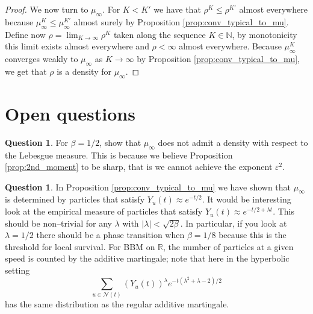 \documentclass{article}
\theoremstyle{definition}
\newtheorem{quest}[thm]{Question}
\numberwithin{equation}{section}
\numberwithin{thm}{section}
\newcommand*{\eps}{\ensuremath{\varepsilon}}            %
\newcommand*{\RR}{\ensuremath{\mathbb{R}}}	        	%
\newcommand*{\NN}{\ensuremath{\mathbb{N}}}		        %
\begin{document}
\begin{proof}
    We now turn to $\mu_\infty$. For $K<K'$ we have that $\rho^K \leq \rho^{K'}$ almost everywhere because $\mu^K_\infty \leq \mu^{K'}_\infty$ almost surely by Proposition \ref{prop:conv_typical_to_mu}. Define now $\rho = \lim_{K \to \infty} \rho^K$ taken along the sequence $K\in \NN$, by monotonicity this limit exists almost everywhere and $\rho<\infty$ almost everywhere. Because $\mu^K_\infty$ converges weakly to $\mu_\infty$ as $K\to \infty$ by Proposition \ref{prop:conv_typical_to_mu}, we get that $\rho$ is a density for $\mu_\infty$. 
\end{proof}

\section{Open questions}\label{sec:open_questions}

\begin{quest}
    For $\beta=1/2$, show that $\mu_\infty$ does not admit a density with respect to the Lebesgue measure. This is because we believe Proposition \ref{prop:2nd_moment} to be sharp, that is we cannot achieve the exponent $\eps^2$. 
\end{quest}

\begin{quest}
    In Proposition \ref{prop:conv_typical_to_mu} we have shown that $\mu_\infty$ is determined by particles that satisfy $Y_u(t)\approx e^{-t/2}$. It would be interesting look at the empirical measure of particles that satisfy $Y_u(t)\approx e^{-t/2+\lambda t}$. This should be non--trivial for any $\lambda$ with $\vert \lambda \vert < \sqrt{2\beta}$. In particular, if you look at $\lambda=1/2$ there should {be} a phase transition when $\beta=1/8$ because this is the threshold for local survival. For BBM on $\RR$, the  number of particles {at a given speed} is counted by the additive martingale; note that here in the hyperbolic setting
    \begin{equation*}
        \sum_{u\in \mathcal{N}(t)} (Y_u(t))^\lambda e^{-t(\lambda^2+\lambda-2)/2}
    \end{equation*}
    has the same distribution as the regular additive martingale. 
\end{quest}
\end{document}
